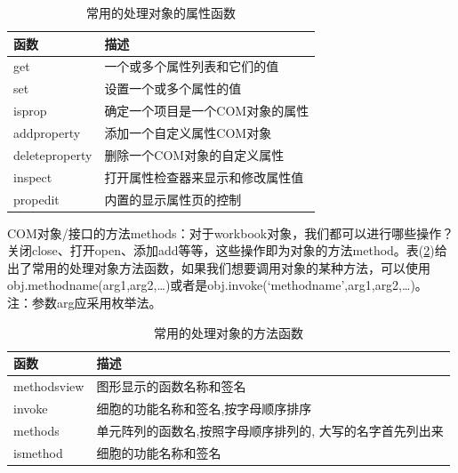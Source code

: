             \begin{table}[H]
            \caption{常用的处理对象的属性函数}
            \label{tab:常用的处理对象的属性函数}
            \centering
            \begin{tabular}{l|l}
                \toprule
                函数 & 描述 \\
                \midrule
            get &一个或多个属性列表和它们的值\\
            set &设置一个或多个属性的值\\
            isprop &确定一个项目是一个COM对象的属性\\
            addproperty &添加一个自定义属性COM对象\\
            deleteproperty &删除一个COM对象的自定义属性\\
            inspect &打开属性检查器来显示和修改属性值\\
            propedit &内置的显示属性页的控制\\
                \bottomrule
            \end{tabular}
            \end{table}
            \par
            COM对象/接口的方法methods：对于workbook对象，我们都可以进行哪些操作？关闭close、打开open、添加add等等，这些操作即为对象的方法method。表(\ref{tab:常用的处理对象的方法函数})给出了常用的处理对象方法函数，如果我们想要调用对象的某种方法，可以使用obj.methodname(arg1,arg2,…)或者是obj.invoke(‘methodname’,arg1,arg2,…)。\\
            注：参数arg应采用枚举法。
            \begin{table}[H]
            \caption{常用的处理对象的方法函数}
            \label{tab:常用的处理对象的方法函数}
            \centering
            \begin{tabular}{l|l}
                \toprule
                函数 & 描述 \\
                \midrule
                methodsview & 图形显示的函数名称和签名\\
                invoke  & 细胞的功能名称和签名,按字母顺序排序\\
                methods & 单元阵列的函数名,按照字母顺序排列的, 大写的名字首先列出来\\
                ismethod & 细胞的功能名称和签名\\
                \bottomrule
            \end{tabular}
            \end{table}

